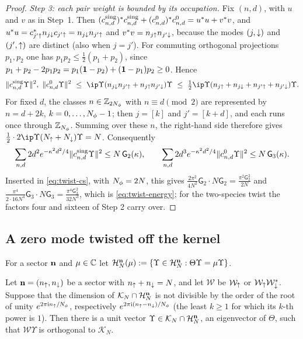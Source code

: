 \begin{proof}
\emph{Step 3: each pair weight is bounded by its occupation.} Fix $(n,d)$, with $u$ and $v$ as in Step~1. Then
$(c^{\rm sing}_{n,d})^*c^{\rm sing}_{n,d}+(c^0_{n,d})^*c^0_{n,d}=u^*u+v^*v$, and $u^*u=c_{j'{\uparrow}}^*n_{j{\downarrow}}c_{j'{\uparrow}}=n_{j{\downarrow}}n_{j'{\uparrow}}$ and
$v^*v=n_{j{\uparrow}}n_{j'{\downarrow}}$, because the modes $(j,{\downarrow})$ and $(j',{\uparrow})$ are distinct (also when $j=j'$). For commuting
orthogonal projections $p_1,p_2$ one has $p_1p_2\le\frac12(p_1+p_2)$, since $p_1+p_2-2p_1p_2=p_1(\mathbf{1}-p_2)+(\mathbf{1}-p_1)p_2\ge0$.
Hence
\[
\norm{c^{\rm sing}_{n,d}\Upsilon}^2,\ \norm{c^0_{n,d}\Upsilon}^2\ \le\ \ip\Upsilon{(n_{j\dn}n_{j'\up}+n_{j\up}n_{j'\dn})\Upsilon}
\ \le\ \tfrac12\ip\Upsilon{(n_{j\up}+n_{j\dn}+n_{j'\up}+n_{j'\dn})\Upsilon}.
\]
For fixed $d$, the classes $n\in\mathbb{Z}_{2N_{\phi}}$ with $n\equiv d\pmod2$ are represented by $n=d+2k$, $k=0,\dots,N_{\phi}-1$; then
$j=[k]$ and $j'=[k+d]$, and each runs once through $\mathbb{Z}_{N_{\phi}}$. Summing over these $n$, the right-hand side therefore gives
$\frac12\cdot2\ip\Upsilon{(\Nup+\Ndn)\Upsilon}=N$. Consequently
\[
\sum_{n,d}2d^2e^{-\kappa^2d^2/4}\lVert c^{\rm sing}_{n,d}\Upsilon\rVert^2\le N\,\mathsf G_2(\kappa),\qquad
\sum_{n,d}2d^3e^{-\kappa^2d^2/4}\lVert c^0_{n,d}\Upsilon\rVert^2\le N\,\mathsf G_3(\kappa).
\]
Inserted in \eqref{eq:twist-cs}, with $N_{\phi}=2N$, this gives
$\frac{2\pi^2}{4N^2}\mathsf G_2\cdot N\mathsf G_2=\frac{\pi^2\mathsf G_2^2}{2N}$ and
$\frac{\pi^4}{2\cdot16N^4}\mathsf G_3\cdot N\mathsf G_3=\frac{\pi^4\mathsf G_3^2}{32N^3}$, which is \eqref{eq:twist-energy}; for the two-species
twist the factors four and sixteen of Step 2 carry over.
\end{proof}

\subsection{A zero mode twisted off the kernel}

For a sector $\mathbf{n}$ and $\mu\in\mathbb{C}$ let $\mathcal{H}_N^{\mathbf{n}}(\mu):=\{\Upsilon\in\mathcal{H}_N^{\mathbf{n}}:\Theta\Upsilon=\mu\Upsilon\}$.

\begin{lemma}\label{lem:twist-off}
Let $\mathbf{n}=(n_{\uparrow},n_{\downarrow})$ be a sector with $n_{\uparrow}+n_{\downarrow}=N$, and let $\mathcal W$ be $\mathcal W_{\uparrow}$ or $\mathcal W_{\uparrow}\mathcal W_{\downarrow}^*$.
Suppose that the dimension of $\mathcal K_N\cap\mathcal{H}_N^{\mathbf{n}}$ is not divisible by the order of the root of unity
$e^{2\pi\mathrm{i} n_{\uparrow}/N_{\phi}}$, respectively $e^{2\pi\mathrm{i}(n_{\uparrow}-n_{\downarrow})/N_{\phi}}$ (the least $k\ge1$ for which its $k$-th power is
$1$). Then there is a unit vector $\Upsilon\in\mathcal K_N\cap\mathcal{H}_N^{\mathbf{n}}$, an eigenvector of $\Theta$, such that $\mathcal W\Upsilon$ is
orthogonal to $\mathcal K_N$.
\end{lemma}

